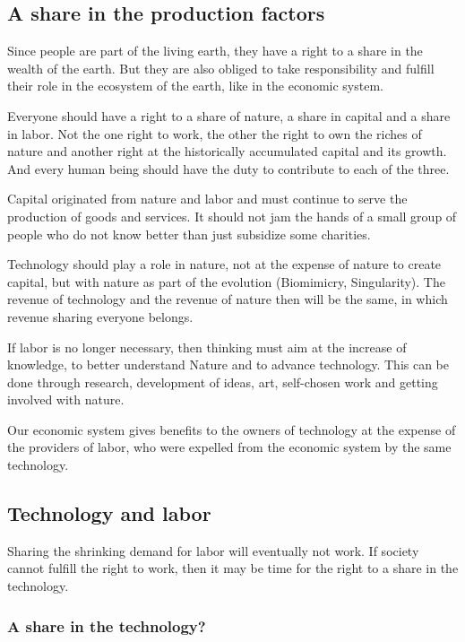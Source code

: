 \documentclass[11pt]{article}
\begin{document}
\subsection{A share in the production factors}
\label{sec:orge453ad1}

Since people are part of the living earth, they have a right to a share in the wealth of the earth. But they are also obliged to take responsibility and fulfill their role in the ecosystem of the earth, like in the economic system.

Everyone should have a right to a share of nature, a share in capital and a share in labor. Not the one right to work, the other the right to own the riches of nature and another right at the historically accumulated capital and its growth. And every human being should have the duty to contribute to each of the three.

Capital originated from nature and labor and must continue to serve the production of goods and services. It should not jam the hands of a small group of people who do not know better than just subsidize some charities.

Technology should play a role in nature, not at the expense of nature to create capital, but with nature as part of the evolution (Biomimicry, Singularity). The revenue of technology and the revenue of nature then will be the same, in which revenue sharing everyone belongs.

If labor is no longer necessary, then thinking must aim at the increase of knowledge, to better understand Nature and to advance technology. This can be done through research, development of ideas, art, self-chosen work and getting involved with nature.

Our economic system gives benefits to the owners of technology at the expense of the providers of labor, who were expelled from the economic system by the same technology.

\subsection{Technology and labor}
\label{sec:org0437e95}

Sharing the shrinking demand for labor will eventually not work. If society cannot fulfill the right to work, then it may be time for the right to a share in the technology.

\subsubsection{A share in the technology?}
\label{sec:org58cbe6c}
\end{document}
